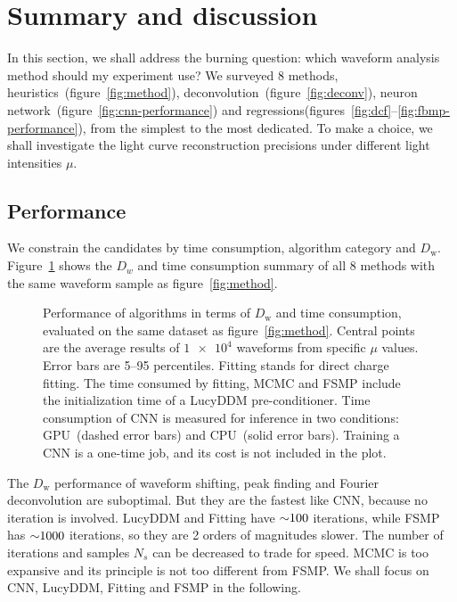 \section{Summary and discussion}
\label{sec:discussion}

In this section, we shall address the burning question: which waveform analysis method should my experiment use?  We surveyed 8 methods, heuristics~(figure~\ref{fig:method}), deconvolution~(figure~\ref{fig:deconv}), neuron network~(figure~\ref{fig:cnn-performance}) and regressions(figures~\ref{fig:dcf}--\ref{fig:fbmp-performance}), from the simplest to the most dedicated.  To make a choice, we shall investigate the light curve reconstruction precisions under different light intensities $\mu$.

\subsection{Performance}

We constrain the candidates by time consumption, algorithm category and $D_\mathrm{w}$.  Figure~\ref{fig:chargesummary} shows the $D_w$ and time consumption summary of all 8 methods with the same waveform sample as figure~\ref{fig:method}.
\begin{figure}[H]
    \centering
    \resizebox{\textwidth}{!}{}
    \caption{\label{fig:chargesummary} Performance of algorithms in terms of $D_\mathrm{w}$ and time consumption, evaluated on the same dataset as figure~\ref{fig:method}. Central points are the average results of $\num[retain-unity-mantissa=false]{1e4}$ waveforms from specific $\mu$ values.  Error bars are 5--95 percentiles.  Fitting stands for direct charge fitting. The time consumed by fitting, MCMC and FSMP include the initialization time of a LucyDDM pre-conditioner.  Time consumption of CNN is measured for inference in two conditions: GPU\protect\footnotemark~(dashed error bars) and CPU\protect\footnotemark~(solid error bars).  Training a CNN is a one-time job, and its cost is not included in the plot.}
\end{figure}
\addtocounter{footnote}{-2}

The $D_\mathrm{w}$ performance of waveform shifting, peak finding and Fourier deconvolution are suboptimal.  But they are the fastest like CNN, because no iteration is involved.  LucyDDM and Fitting have $\num{\sim 100}$ iterations, while FSMP has $\num{\sim 1000}$ iterations, so they are 2 orders of magnitudes slower.  The number of iterations and samples $N_s$ can be decreased to trade for speed.  MCMC is too expansive and its principle is not too different from FSMP.  We shall focus on CNN, LucyDDM, Fitting and FSMP in the following.

